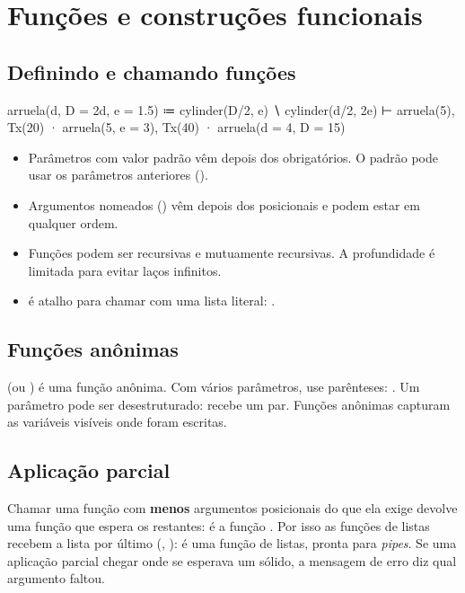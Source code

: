 \section{Funções e construções funcionais}\label{sec:funcional}

\subsection{Definindo e chamando funções}
\begin{csg}[run]
arruela(d, D = 2d, e = 1.5) ≔ cylinder(D/2, e) ∖ cylinder(d/2, 2e)
⊢ arruela(5), Tx(20) · arruela(5, e = 3), Tx(40) · arruela(d = 4, D = 15)
\end{csg}
\begin{itemize}
  \item Parâmetros com valor padrão vêm depois dos obrigatórios. O padrão pode usar os parâmetros anteriores ().
  \item Argumentos nomeados () vêm depois dos posicionais e podem estar em qualquer ordem.
  \item Funções podem ser recursivas e mutuamente recursivas. A profundidade é limitada para evitar laços infinitos.
  \item {} é atalho para chamar  com uma lista literal: .
\end{itemize}

\subsection{Funções anônimas}
 (ou ) é uma função anônima. Com vários parâmetros, use parênteses:
. Um parâmetro pode ser desestruturado:  recebe um par.
Funções anônimas capturam as variáveis visíveis onde foram escritas.

\subsection{Aplicação parcial}
Chamar uma função com \textbf{menos} argumentos posicionais do que ela exige devolve uma função que espera os restantes:
 é a função . Por isso as funções de listas recebem a lista por
último (, ):  é uma função de listas, pronta para \emph{pipes}.
Se uma aplicação parcial chegar onde se esperava um sólido, a mensagem de erro diz qual argumento faltou.

